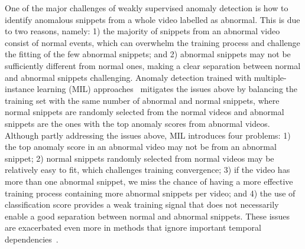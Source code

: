\documentclass[10pt,twocolumn,letterpaper]{article}
\begin{document}
One of the major challenges of weakly supervised anomaly detection is how to identify anomalous snippets from a whole video labelled as abnormal. 
This is due to two reasons, namely: 1) the majority of snippets from an abnormal video consist of normal events, which can overwhelm the training process and challenge the fitting of the few abnormal snippets; and 2) abnormal snippets may not be sufficiently different from normal ones, making a clear separation between normal and abnormal snippets challenging.
Anomaly detection trained with multiple-instance learning (MIL) approaches~\cite{sultani2018real,Wu2020not,zhu2019motion,8803657} mitigates the issues above by balancing the training set with the same number of abnormal and normal snippets, where normal snippets are randomly selected from the normal videos and abnormal snippets are the ones with the top anomaly scores from abnormal videos. Although partly addressing the issues above, MIL introduces four problems: 1) the top anomaly score in an abnormal video may not be from an abnormal snippet; 2) normal snippets randomly selected from normal videos may be relatively easy to fit, which challenges training convergence; 3) if the video has more than one abnormal snippet, we miss the chance of having a more effective training process containing more abnormal snippets per video; and 4) the use of classification score provides a weak training signal that does not necessarily enable a good separation between normal and abnormal snippets.
These issues are exacerbated even more in methods that ignore important temporal dependencies~\cite{zhong2019graph,liu2018future,Wu2020not,luo2017revisit}. 
\end{document}

